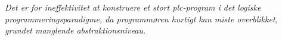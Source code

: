 \noindent \textit{Det er for ineffektivitet at konstruere et stort \gls{plc}-program i det logiske programmeringsparadigme, da programmøren hurtigt kan miste overblikket, grundet manglende abstraktionsniveau.}








